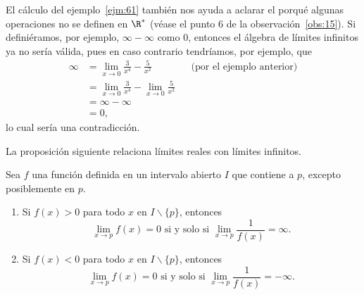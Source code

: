 \documentclass[12pt,a4paper]{book}
\begin{document}
    El cálculo del ejemplo~\ref{ejm:61} también nos ayuda a aclarar el porqué algunas
    operaciones no se definen en $\R^{*}$ (véase el punto 6 de la observación~\ref{obs:15}). Si
    definiéramos, por ejemplo, $\infty-\infty$ como $0$, entonces el álgebra de límites
    infinitos ya no sería válida, pues en caso contrario tendríamos, por ejemplo,
    que
    \begin{align*}
        \infty&=\lim_{x\to 0}\frac{3}{x^{4}}-\frac{5}{x^{2}} &&\text{(por el ejemplo anterior)}\\
        &=\lim_{x\to 0}\frac{3}{x^{4}}-\lim_{x\to 0}\frac{5}{x^{2}}\\
        &=\infty-\infty\\
        &=0,
    \end{align*}
    lo cual sería una contradicción.

    La proposición siguiente relaciona límites reales con límites infinitos.

    \begin{proposicion}\label{prop:48}
        Sea $f$ una función definida en un intervalo abierto $I$ que
        contiene a $p$, excepto posiblemente en $p$.
        \begin{enumerate}
            \item Si $f(x)>0$ para todo $x$ en $I\backslash\{p\}$, entonces
            \begin{equation*}
                \lim_{x\to p}f(x)=0\text{ si y solo si }\lim_{x\to p}\frac{1}{f(x)}=\infty.
            \end{equation*}
            \item Si $f(x)<0$ para todo $x$ en $I\backslash\{p\}$, entonces
            \begin{equation*}
                \lim_{x\to p}f(x)=0\text{ si y solo si }\lim_{x\to p}\frac{1}{f(x)}=-\infty.
            \end{equation*}
        \end{enumerate}
    \end{proposicion}
\end{document}
